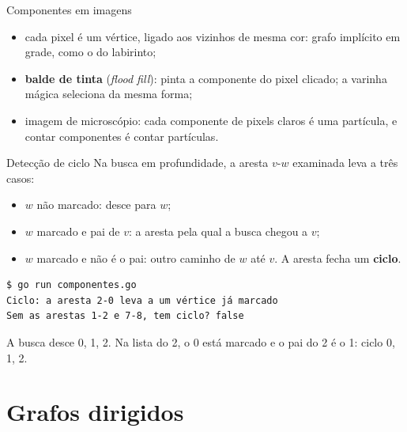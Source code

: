 \documentclass{beamer}
\begin{document}
\begin{frame}{Componentes em imagens}
	\begin{center}
		\hspace{1cm}
	\end{center}

	\begin{itemize}
		\item cada pixel é um vértice, ligado aos vizinhos de mesma cor: grafo
		      implícito em grade, como o do labirinto;
		\item \textbf{balde de tinta} (\textit{flood fill}): pinta a componente
		      do pixel clicado; a varinha mágica seleciona da mesma forma;
		\item imagem de microscópio: cada componente de pixels claros é uma
		      partícula, e contar componentes é contar partículas.
	\end{itemize}
\end{frame}

\begin{frame}[fragile]{Detecção de ciclo}
	Na busca em profundidade, a aresta $v$-$w$ examinada leva a três casos:
	\begin{itemize}
		\item $w$ não marcado: desce para $w$;
		\item $w$ marcado e pai de $v$: a aresta pela qual a busca chegou a $v$;
		\item $w$ marcado e não é o pai: outro caminho de $w$ até $v$. A aresta
		      fecha um \textbf{ciclo}.
	\end{itemize}

	\begin{verbatim}
$ go run componentes.go
Ciclo: a aresta 2-0 leva a um vértice já marcado
Sem as arestas 1-2 e 7-8, tem ciclo? false
\end{verbatim}

	A busca desce 0, 1, 2. Na lista do 2, o 0 está marcado e o pai do 2 é o 1:
	ciclo 0, 1, 2.
\end{frame}

\section{Grafos dirigidos}
\end{document}
